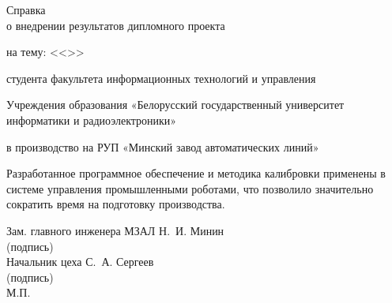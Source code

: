\thispagestyle{empty}

\begin{center}
    Справка \\[0.5em]

    о внедрении результатов дипломного проекта

    на тему: <<\topicName>>

    студента факультета информационных технологий и управления

    Учреждения образования «Белорусский государственный университет информатики и радиоэлектроники»

    \fio

    в производство на РУП «Минский завод автоматических линий»
\end{center}

Разработанное программное обеспечение и методика калибровки применены в системе управления промышленными роботами, что позволило значительно сократить время на подготовку производства.

\vspace{2cm}

\begin{flushleft}
   Зам. главного инженера МЗАЛ \hspace{2em} \uline{\hspace*{8em}} \hspace{2em} Н.~И. Минин\\ [-0.25em]
   {\footnotesize\hspace{9.5cm}(подпись)}\\[1em]

   Начальник цеха \hspace{9em} \uline{\hspace*{8em}} \hspace{2em} С.~А. Сергеев\\ [-0.25em]
   {\footnotesize\hspace{9.5cm}(подпись)}\\

   М.П.
\end{flushleft}